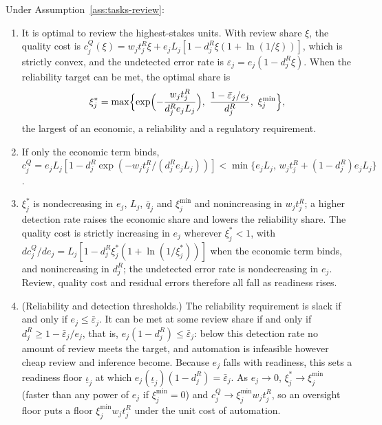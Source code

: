 \begin{proposition}\label{prop:tasks-review}
Under Assumption~\ref{ass:tasks-review}:
\begin{enumerate}
\item[(a)] It is optimal to review the highest-stakes units. With review share $\xi$, the quality cost is $c^Q_j(\xi)=w_jt^R_j\xi+e_jL_j[1-d^R_j\xi(1+\ln(1/\xi))]$, which is strictly convex, and the undetected error rate is $\varepsilon_j=e_j(1-d^R_j\xi)$. When the reliability target can be met, the optimal share is
\begin{equation}\label{eq:tasks-xi}
\xi^*_j=\max\Bigl\{\exp\Bigl(-\frac{w_jt^R_j}{d^R_je_jL_j}\Bigr),\ \frac{1-\bar\varepsilon_j/e_j}{d^R_j},\ \xi^{\min}_j\Bigr\},
\end{equation}
the largest of an economic, a reliability and a regulatory requirement.
\item[(b)] If only the economic term binds, $c^Q_j=e_jL_j[1-d^R_j\exp(-w_jt^R_j/(d^R_je_jL_j))]<\min\{e_jL_j,\,w_jt^R_j+(1-d^R_j)e_jL_j\}$.
\item[(c)] $\xi^*_j$ is nondecreasing in $e_j$, $L_j$, $\bar q_j$ and $\xi^{\min}_j$ and nonincreasing in $w_jt^R_j$; a higher detection rate raises the economic share and lowers the reliability share. The quality cost is strictly increasing in $e_j$ wherever $\xi^*_j<1$, with $dc^Q_j/de_j=L_j[1-d^R_j\xi^*_j(1+\ln(1/\xi^*_j))]$ when the economic term binds, and nonincreasing in $d^R_j$; the undetected error rate is nondecreasing in $e_j$. Review, quality cost and residual errors therefore all fall as readiness rises.
\item[(d)] (Reliability and detection thresholds.) The reliability requirement is slack if and only if $e_j\le\bar\varepsilon_j$. It can be met at some review share if and only if $d^R_j\ge 1-\bar\varepsilon_j/e_j$, that is, $e_j(1-d^R_j)\le\bar\varepsilon_j$: below this detection rate no amount of review meets the target, and automation is infeasible however cheap review and inference become. Because $e_j$ falls with readiness, this sets a readiness floor $\underline\iota_j$ at which $e_j(\underline\iota_j)(1-d^R_j)=\bar\varepsilon_j$. As $e_j\to 0$, $\xi^*_j\to\xi^{\min}_j$ (faster than any power of $e_j$ if $\xi^{\min}_j=0$) and $c^Q_j\to\xi^{\min}_jw_jt^R_j$, so an oversight floor puts a floor $\xi^{\min}_jw_jt^R_j$ under the unit cost of automation.
\end{enumerate}
\end{proposition}

